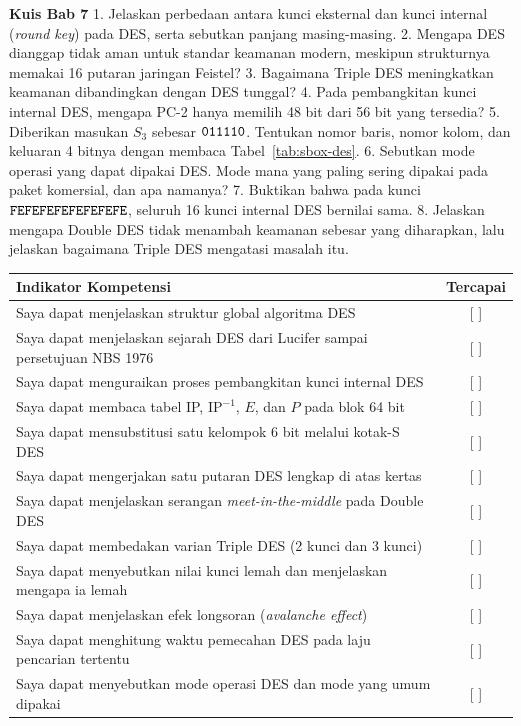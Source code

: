 
\begin{obeassessment}
\textbf{Kuis Bab 7}
1. Jelaskan perbedaan antara kunci eksternal dan kunci internal
   (\textit{round key}) pada DES, serta sebutkan panjang masing-masing.
2. Mengapa DES dianggap tidak aman untuk standar keamanan modern, meskipun
   strukturnya memakai 16 putaran jaringan Feistel?
3. Bagaimana Triple DES meningkatkan keamanan dibandingkan dengan DES tunggal?
4. Pada pembangkitan kunci internal DES, mengapa PC-2 hanya memilih 48 bit dari
   56 bit yang tersedia?
5. Diberikan masukan $S_3$ sebesar $\texttt{011110}$. Tentukan nomor baris, nomor
   kolom, dan keluaran 4 bitnya dengan membaca Tabel~\ref{tab:sbox-des}.
6. Sebutkan mode operasi yang dapat dipakai DES. Mode mana yang paling sering
   dipakai pada paket komersial, dan apa namanya?
7. Buktikan bahwa pada kunci $\texttt{FEFEFEFEFEFEFEFE}$, seluruh 16 kunci
   internal DES bernilai sama.
8. Jelaskan mengapa Double DES tidak menambah keamanan sebesar yang
   diharapkan, lalu jelaskan bagaimana Triple DES mengatasi masalah itu.
\end{obeassessment}
\begin{competencychecklist}
\begin{tabularx}{\linewidth}{|X|c|}
\hline
Indikator Kompetensi & Tercapai \\
\hline
Saya dapat menjelaskan struktur global algoritma DES & [ ] \\
\hline
Saya dapat menjelaskan sejarah DES dari Lucifer sampai persetujuan NBS 1976 & [ ] \\
\hline
Saya dapat menguraikan proses pembangkitan kunci internal DES & [ ] \\
\hline
Saya dapat membaca tabel IP, $\text{IP}^{-1}$, $E$, dan $P$ pada blok 64 bit & [ ] \\
\hline
Saya dapat mensubstitusi satu kelompok 6 bit melalui kotak-S DES & [ ] \\
\hline
Saya dapat mengerjakan satu putaran DES lengkap di atas kertas & [ ] \\
\hline
Saya dapat menjelaskan serangan \textit{meet-in-the-middle} pada Double DES & [ ] \\
\hline
Saya dapat membedakan varian Triple DES (2 kunci dan 3 kunci) & [ ] \\
\hline
Saya dapat menyebutkan nilai kunci lemah dan menjelaskan mengapa ia lemah & [ ] \\
\hline
Saya dapat menjelaskan efek longsoran (\textit{avalanche effect}) & [ ] \\
\hline
Saya dapat menghitung waktu pemecahan DES pada laju pencarian tertentu & [ ] \\
\hline
Saya dapat menyebutkan mode operasi DES dan mode yang umum dipakai & [ ] \\
\hline
\end{tabularx}
\end{competencychecklist}
